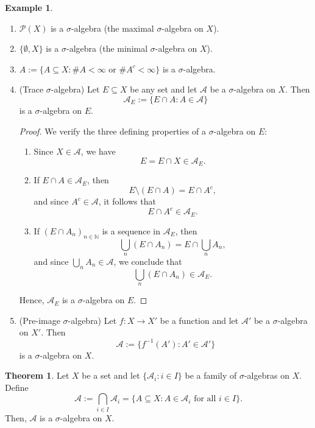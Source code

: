 \documentclass{article}
\theoremstyle{definition}
\newtheorem{theorem}{Theorem}[section]
\newtheorem{example}{Example}[section]
\begin{document}
\medskip
\begin{example}\leavevmode\
\begin{enumerate}
    \item $\mathcal{P}(X)$ is a $\sigma$-algebra (the maximal $\sigma$-algebra on $X$).
    
    \item $\{\emptyset, X\}$ is a $\sigma$-algebra (the minimal $\sigma$-algebra on $X$).
    
    \item $A := \{A \subseteq X : \#A < \infty \text{ or } \#A^c < \infty\}$ is a $\sigma$-algebra.

    \item (Trace $\sigma$-algebra) Let $E \subseteq X$ be any set and let $\mathcal{A}$ be a $\sigma$-algebra on $X$. Then
    \[
    \mathcal{A}_E := \{E \cap A : A \in \mathcal{A}\}
    \]
    is a $\sigma$-algebra on $E$.

    \begin{proof}
We verify the three defining properties of a $\sigma$-algebra on $E$:

\begin{enumerate}
    \item Since $X \in \mathcal{A}$, we have
    \[
    E = E \cap X \in \mathcal{A}_E.
    \]
    \item If $E \cap A \in \mathcal{A}_E$, then
    \[
    E \setminus (E \cap A) = E \cap A^c,
    \]
    and since $A^c \in \mathcal{A}$, it follows that
    \[
    E \cap A^c \in \mathcal{A}_E.
    \]
    \item If $(E \cap A_n)_{n \in \mathbb{N}}$ is a sequence in $\mathcal{A}_E$, then
    \[
    \bigcup_{n} (E \cap A_n) = E \cap \bigcup_{n} A_n,
    \]
    and since $\bigcup_n A_n \in \mathcal{A}$, we conclude that
    \[
    \bigcup_n (E \cap A_n) \in \mathcal{A}_E.
    \]
\end{enumerate}
Hence, $\mathcal{A}_E$ is a $\sigma$-algebra on $E$.
\end{proof}

    \item (Pre-image $\sigma$-algebra) Let $f : X \to X'$ be a function and let $\mathcal{A}'$ be a $\sigma$-algebra on $X'$. Then
    \[
    \mathcal{A} := \{f^{-1}(A') : A' \in \mathcal{A}'\}
    \]
    is a $\sigma$-algebra on $X$.
\end{enumerate}
\end{example}


\medskip
\begin{theorem}
Let $X$ be a set and let $\{\mathcal{A}_i : i \in I\}$ be a family of $\sigma$-algebras on $X$. Define
\[
\mathcal{A} := \bigcap_{i \in I} \mathcal{A}_i = \{ A \subseteq X : A \in \mathcal{A}_i \text{ for all } i \in I \}.
\]
Then, $\mathcal{A}$ is a $\sigma$-algebra on $X$.
\end{theorem}
\end{document}
